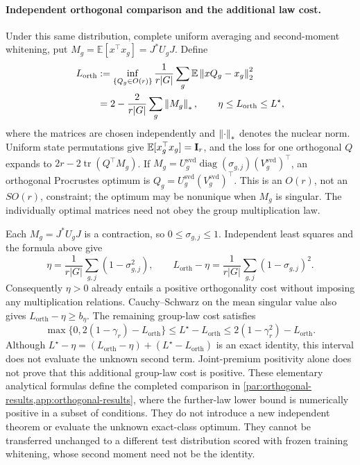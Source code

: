 \paragraph{Independent orthogonal comparison and the additional law cost.}
Under this same distribution, complete uniform averaging and second-moment whitening, put $M_g=\mathbb E[x^\top x_g]=J^*U_gJ$. Define
\begin{equation}
 \begin{aligned}
 L_{\mathrm{orth}}
 &:=\inf_{\{Q_g\in O(r)\}}\frac1{r|G|}\sum_g
       \mathbb E\left\lVert xQ_g-x_g\right\rVert_2^2\\
 &=2-\frac2{r|G|}\sum_g\left\lVert M_g\right\rVert_*,
 \qquad \eta\le L_{\mathrm{orth}}\le L^\star,
 \end{aligned}
 \label{sp:orthogonal-comparator}
\end{equation}
where the matrices are chosen independently and $\left\lVert \cdot\right\rVert_*$ denotes the nuclear norm. Uniform state permutations give $\mathbb E[x_g^\top x_g]=\mathbf{I}_r$, and the loss for one orthogonal $Q$ expands to $2r-2\operatorname{tr}(Q^\top M_g)$. If $M_g=U_g^{\mathrm{svd}}\operatorname{diag}(\sigma_{g,j})(V_g^{\mathrm{svd}})^\top$, an orthogonal Procrustes optimum is $Q_g=U_g^{\mathrm{svd}}(V_g^{\mathrm{svd}})^\top$. This is an $O(r)$, not an $SO(r)$, constraint; the optimum may be nonunique when $M_g$ is singular. The individually optimal matrices need not obey the group multiplication law.

Each $M_g=J^*U_gJ$ is a contraction, so $0\le\sigma_{g,j}\le1$. Independent least squares and the formula above give
\[
 \eta=\frac1{r|G|}\sum_{g,j}(1-\sigma_{g,j}^2),\qquad
 L_{\mathrm{orth}}-\eta
 =\frac1{r|G|}\sum_{g,j}(1-\sigma_{g,j})^2.
\]
Consequently $\eta>0$ already entails a positive orthogonality cost without imposing any multiplication relations. Cauchy--Schwarz on the mean singular value also gives $L_{\mathrm{orth}}-\eta\ge b_\eta$. The remaining group-law cost satisfies
\[
 \max\{0,2(1-\gamma_r)-L_{\mathrm{orth}}\}
 \le L^\star-L_{\mathrm{orth}}
 \le 2(1-\gamma_r^2)-L_{\mathrm{orth}}.
\]
Although $L^\star-\eta=(L_{\mathrm{orth}}-\eta)+(L^\star-L_{\mathrm{orth}})$ is an exact identity, this interval does not evaluate the unknown second term. Joint-premium positivity alone does not prove that this additional group-law cost is positive. These elementary analytical formulas define the completed comparison in \cref{par:orthogonal-results,app:orthogonal-results}, where the further-law lower bound is numerically positive in a subset of conditions. They do not introduce a new independent theorem or evaluate the unknown exact-class optimum. They cannot be transferred unchanged to a different test distribution scored with frozen training whitening, whose second moment need not be the identity.

